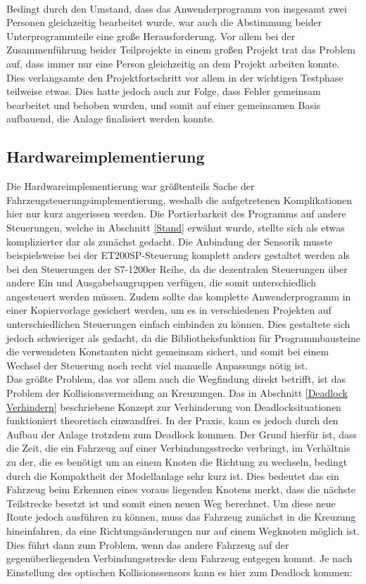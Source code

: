 		\\[4pt]
		Bedingt durch den Umstand, dass das Anwenderprogramm von insgesamt zwei Personen gleichzeitig bearbeitet wurde, war auch die Abstimmung beider Unterprogrammteile eine große Herausforderung. Vor allem bei der Zusammenführung beider Teilprojekte in einem großen Projekt trat das Problem auf, dass immer nur eine Person gleichzeitig an dem Projekt arbeiten konnte. Dies verlangsamte den Projektfortschritt vor allem in der wichtigen Testphase teilweise etwas. Dies hatte jedoch auch zur Folge, dass Fehler gemeinsam bearbeitet und behoben wurden, und somit auf einer gemeinsamen Basis aufbauend, die Anlage finalisiert werden konnte.
		
	\subsection{Hardwareimplementierung}
		\label{Probleme_Hardware}
		Die Hardwareimplementierung war größtenteils Sache der Fahrzeugsteuerungsimplementierung, weshalb die aufgetretenen Komplikationen hier nur kurz angerissen werden. Die Portierbarkeit des Programms auf andere Steuerungen, welche in Abschnitt \ref{Stand} erwähnt wurde, stellte sich als etwas komplizierter dar als zunächst gedacht. Die Anbindung der Sensorik musste beispielsweise bei der ET200SP-Steuerung komplett anders gestaltet werden als bei den Steuerungen der S7-1200er Reihe, da die dezentralen Steuerungen über andere Ein und Ausgabebaugruppen verfügen, die somit unterschiedlich angesteuert werden müssen. Zudem sollte das komplette Anwenderprogramm in einer Kopiervorlage gesichert werden, um es in verschiedenen Projekten auf unterschiedlichen Steuerungen einfach einbinden zu können. Dies gestaltete sich jedoch schwieriger als gedacht, da die Bibliotheksfunktion für Programmbausteine die verwendeten Konstanten nicht gemeinsam sichert, und somit bei einem Wechsel der Steuerung noch recht viel manuelle Anpassungs nötig ist.
		\\[4pt]
		Das größte Problem, das vor allem auch die Wegfindung direkt betrifft, ist das Problem der Kollisionsvermeidung an Kreuzungen. Das in Abschnitt \ref{Deadlock Verhindern} beschriebene Konzept zur Verhinderung von Deadlocksituationen funktioniert theoretisch einwandfrei. In der Praxis, kann es jedoch durch den Aufbau der Anlage trotzdem zum Deadlock kommen. Der Grund hierfür ist, dass die Zeit, die ein Fahrzeug auf einer Verbindungsstrecke verbringt, im Verhältnis zu der, die es benötigt um an einem Knoten die Richtung zu wechseln, bedingt durch die Kompaktheit der Modellanlage sehr kurz ist. Dies bedeutet das ein Fahrzeug beim Erkennen eines voraus liegenden Knotens merkt, dass die nächste Teilstrecke besetzt ist und somit einen neuen Weg berechnet. Um diese neue Route jedoch ausführen zu können, muss das Fahrzeug zunächst in die Kreuzung hineinfahren, da eine Richtungsänderungen nur auf einem Wegknoten möglich ist. Dies führt dann zum Problem, wenn das andere Fahrzeug auf der gegenüberliegenden Verbindungsstrecke dem Fahrzeug entgegen kommt. Je nach Einstellung des optischen Kollisionssensors kann es hier zum Deadlock kommen:
		
